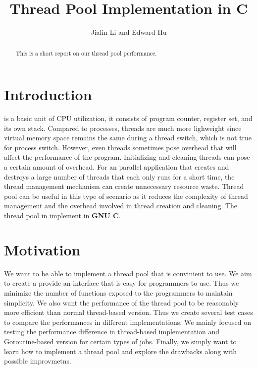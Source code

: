 \documentclass[journal, a4paper]{IEEEtran}
\begin{document}
	\title{Thread Pool Implementation in C}
	\author{Jialin Li and Edward Hu}
	\maketitle

\begin{abstract}
	This is a short report on our thread pool performance.
\end{abstract}

\section{Introduction}
	 is a basic unit of CPU utilization, it consists of program counter, register set, and its own stack. Compared to processes, threads are much more lighweight since virtual memory space remains the same during a thread switch, which is not true for process switch. However, even threads sometimes pose overhead that will affect the performance of the program. Initializing and cleaning threads can pose a certain amount of overhead. For an parallel application that creates and destroys a large number of threads that each only runs for a short time, the thread management mechanism can create unnecessary resource waste. Thread pool can be useful in this type of scenario as it reduces the complexity of thread management and the overhead involved in thread creation and cleaning. The thread pool in implement in \textbf{GNU C}.

\section{Motivation}
	We want to be able to implement a thread pool that is convinient to use. We aim to create a provide an interface that is easy for programmers to use. Thus we minimize the number of functions exposed to the programmers to maintain simplicity. We also want the performance of the thread pool to be reasonably more efficient than normal thread-based version. Thus we create several test cases to compare the performances in different implementations. We mainly focused on testing the performance difference in thread-based implementation and Goroutine-based version for certain types of jobs. Finally, we simply want to learn how to implement a thread pool and explore the drawbacks along with possible improvmetns.\\
\end{document}
